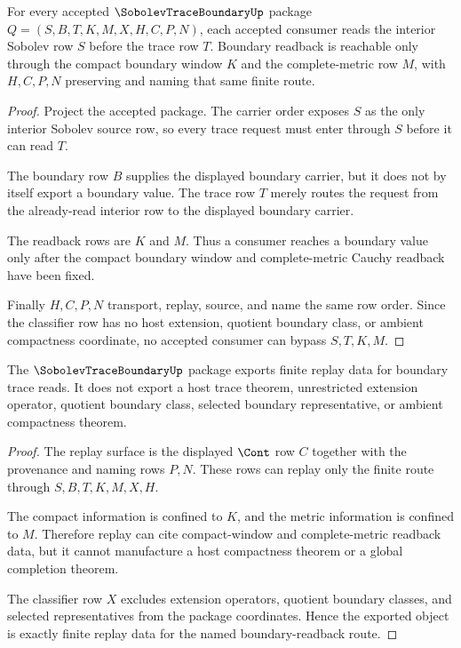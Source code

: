 \begin{theorem}
\label{thm:sobolev-trace-boundary-exactness}
For every accepted $\SobolevTraceBoundaryUp$ package $Q=(S,B,T,K,M,X,H,C,P,N)$, each accepted consumer reads the interior Sobolev row $S$ before the trace row $T$. Boundary readback is reachable only through the compact boundary window $K$ and the complete-metric row $M$, with $H,C,P,N$ preserving and naming that same finite route.
\end{theorem}
\begin{proof}
Project the accepted package. The carrier order exposes $S$ as the only interior Sobolev source row, so every trace request must enter through $S$ before it can read $T$.

The boundary row $B$ supplies the displayed boundary carrier, but it does not by itself export a boundary value. The trace row $T$ merely routes the request from the already-read interior row to the displayed boundary carrier.

The readback rows are $K$ and $M$. Thus a consumer reaches a boundary value only after the compact boundary window and complete-metric Cauchy readback have been fixed.

Finally $H,C,P,N$ transport, replay, source, and name the same row order. Since the classifier row has no host extension, quotient boundary class, or ambient compactness coordinate, no accepted consumer can bypass $S,T,K,M$.
\end{proof}

\begin{theorem}
\label{thm:sobolev-trace-finite-replay}
The $\SobolevTraceBoundaryUp$ package exports finite replay data for boundary trace reads. It does not export a host trace theorem, unrestricted extension operator, quotient boundary class, selected boundary representative, or ambient compactness theorem.
\end{theorem}
\begin{proof}
The replay surface is the displayed $\Cont$ row $C$ together with the provenance and naming rows $P,N$. These rows can replay only the finite route through $S,B,T,K,M,X,H$.

The compact information is confined to $K$, and the metric information is confined to $M$. Therefore replay can cite compact-window and complete-metric readback data, but it cannot manufacture a host compactness theorem or a global completion theorem.

The classifier row $X$ excludes extension operators, quotient boundary classes, and selected representatives from the package coordinates. Hence the exported object is exactly finite replay data for the named boundary-readback route.
\end{proof}

